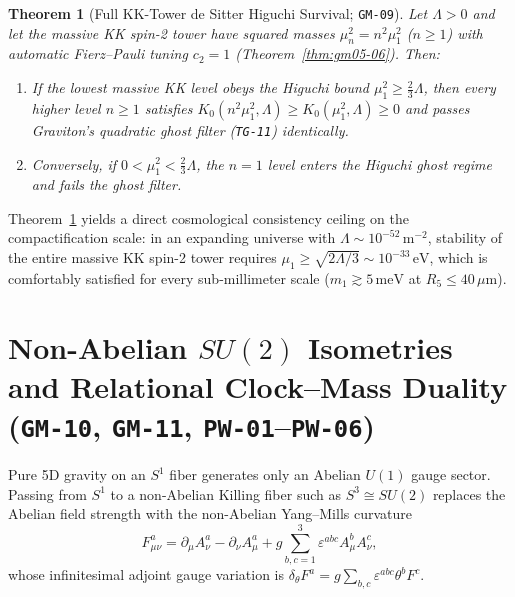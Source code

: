 \documentclass[11pt,a4paper]{article}
\theoremstyle{plain}
\newtheorem{theorem}{Theorem}[section]
\theoremstyle{remark}
\newcommand{\dd}{\partial}
\newcommand{\code}[1]{\texttt{\small #1}}
\begin{document}
\begin{theorem}[Full KK-Tower de Sitter Higuchi Survival; \code{GM-09}]
\label{thm:gm09}
Let $\Lambda > 0$ and let the massive KK spin-2 tower have squared masses $\mu_n^2 = n^2 \mu_1^2$ ($n \ge 1$) with automatic Fierz--Pauli tuning $c_2 = 1$ (Theorem~\ref{thm:gm05-06}). Then:
\begin{enumerate}
  \item If the lowest massive KK level obeys the Higuchi bound $\mu_1^2 \ge \tfrac{2}{3}\Lambda$, then \emph{every} higher level $n \ge 1$ satisfies $K_0(n^2 \mu_1^2, \Lambda) \ge K_0(\mu_1^2, \Lambda) \ge 0$ and passes Graviton's quadratic ghost filter (\code{TG-11}) identically.
  \item Conversely, if $0 < \mu_1^2 < \tfrac{2}{3}\Lambda$, the $n = 1$ level enters the Higuchi ghost regime and fails the ghost filter.
\end{enumerate}
\end{theorem}

Theorem~\ref{thm:gm09} yields a direct cosmological consistency ceiling on the compactification scale: in an expanding universe with $\Lambda \sim 10^{-52}\,\mathrm{m}^{-2}$, stability of the entire massive KK spin-2 tower requires $\mu_1 \ge \sqrt{2\Lambda/3} \sim 10^{-33}\,\mathrm{eV}$, which is comfortably satisfied for every sub-millimeter scale ($m_1 \gtrsim 5\,\mathrm{meV}$ at $R_5 \le 40\,\mu\mathrm{m}$).

\section{Non-Abelian $SU(2)$ Isometries and Relational Clock--Mass Duality (\code{GM-10}, \code{GM-11}, \code{PW-01}--\code{PW-06})}
\label{sec:su2-and-clocks}

Pure 5D gravity on an $S^1$ fiber generates only an Abelian $U(1)$ gauge sector. Passing from $S^1$ to a non-Abelian Killing fiber such as $S^3 \cong SU(2)$ replaces the Abelian field strength with the non-Abelian Yang--Mills curvature
\begin{equation}
  F^a_{\mu\nu} = \dd_\mu A^a_\nu - \dd_\nu A^a_\mu + g \sum_{b,c=1}^3 \varepsilon^{abc} A^b_\mu A^c_\nu,
\end{equation}
whose infinitesimal adjoint gauge variation is $\delta_\theta F^a = g \sum_{b,c} \varepsilon^{abc} \theta^b F^c$.
\end{document}
